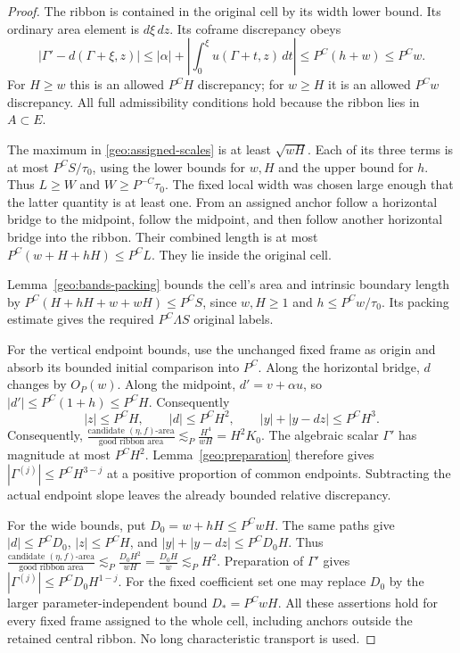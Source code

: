 \documentclass[11pt]{amsart}
\theoremstyle{definition}
\theoremstyle{remark}
\numberwithin{equation}{section}
\begin{document}
\begin{proof}
The ribbon is contained in the original cell by its width lower bound. Its ordinary area element is $d\xi\,dz$. Its coframe discrepancy obeys
\[
|\Gamma'-d(\Gamma+\xi,z)|\le |\alpha|+\left|\int_0^\xi u(\Gamma+t,z)\,dt\right|\le P^C(h+w)\le P^Cw.
\]
For $H\ge w$ this is an allowed $P^CH$ discrepancy; for $w\ge H$ it is an allowed $P^Cw$ discrepancy. All full admissibility conditions hold because the ribbon lies in $A\subset E$.

The maximum in \eqref{geo:assigned-scales} is at least $\sqrt{wH}$. Each of its three terms is at most $P^CS/\tau_0$, using the lower bounds for $w,H$ and the upper bound for $h$. Thus $L\ge W$ and $W\ge P^{-C}\tau_0$. The fixed local width was chosen large enough that the latter quantity is at least one. From an assigned anchor follow a horizontal bridge to the midpoint, follow the midpoint, and then follow another horizontal bridge into the ribbon. Their combined length is at most $P^C(w+H+hH)\le P^CL$. They lie inside the original cell. 

Lemma~\ref{geo:bands-packing} bounds the cell's area and intrinsic boundary length by \(P^C(H+hH+w+wH)\le P^CS\), since \(w,H\ge1\) and \(h\le P^Cw/\tau_0\). Its packing estimate gives the required \(P^C\Lambda S\) original labels.

For the vertical endpoint bounds, use the unchanged fixed frame as origin and absorb its bounded initial comparison into $P^C$. Along the horizontal bridge, $d$ changes by $O_P(w)$. Along the midpoint, $d'=v+\alpha u$, so $|d'|\le P^C(1+h)\le P^CH$. Consequently
\[
|z|\le P^CH,\qquad |d|\le P^CH^2,\qquad |y|+|y-dz|\le P^CH^3.
\]
Consequently, $\frac{\text{candidate }(\eta,f)\text{-area}}{\text{good ribbon area}}\lesssim_P\frac{H^4}{wH}=H^2K_0$. The algebraic scalar $\Gamma'$ has magnitude at most $P^CH^2$. Lemma~\ref{geo:preparation} therefore gives $|\Gamma^{(j)}|\le P^CH^{3-j}$ at a positive proportion of common endpoints. Subtracting the actual endpoint slope leaves the already bounded relative discrepancy.

For the wide bounds, put $D_0=w+hH\le P^CwH$. The same paths give $|d|\le P^CD_0$, $|z|\le P^CH$, and $|y|+|y-dz|\le P^CD_0H$. Thus $\frac{\text{candidate }(\eta,f)\text{-area}}{\text{good ribbon area}}\lesssim_P\frac{D_0H^2}{wH}=\frac{D_0H}{w}\lesssim_P H^2$. Preparation of $\Gamma'$ gives $|\Gamma^{(j)}|\le P^CD_0H^{1-j}$. For the fixed coefficient set one may replace $D_0$ by the larger parameter-independent bound $D_*=P^CwH$. All these assertions hold for every fixed frame assigned to the whole cell, including anchors outside the retained central ribbon. No long characteristic transport is used.
\end{proof}
\end{document}
